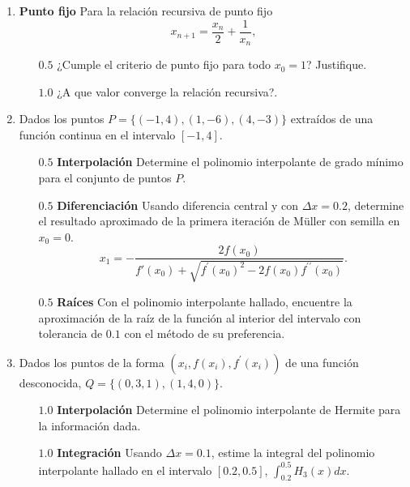 \documentclass[12pt]{article}
\begin{document}
  \begin{enumerate}[leftmargin=*,widest=9]
    \item \textbf{Punto fijo} Para la relación recursiva de punto fijo \[x_{n+1} = \frac{x_n}{2} + \frac{1}{x_n},\]
    \begin{itemize}
    \item[$0.5$] ¿Cumple el criterio de punto fijo para todo $x_0 = 1$? Justifique.
    \vspace{3.5cm}
    \item[$1.0$] ¿A que valor converge la relación recursiva?.
    \vspace{2cm}
    \end{itemize}
 \item Dados los puntos $P=\lbrace (-1, 4), (1, -6), (4, -3) \rbrace$ extraídos de una función continua en el intervalo $\left[-1, 4\right]$.
    \begin{itemize}
    \item[$0.5$] \textbf{Interpolación} Determine el polinomio interpolante de grado mínimo para el conjunto de puntos $P$.
    \vspace{5cm}
    \item[$0.5$] \textbf{Diferenciación} Usando diferencia central y con $\Delta x = 0.2$, determine el resultado aproximado de la primera iteración de M\"uller con semilla en $x_0=0$.
    \[
    x_1 = -\frac{2f(x_0)}{f\prime(x_0)+\sqrt{f^\prime(x_0)^2 - 2f(x_0)f^{\prime\prime}(x_0)}}.
    \]
    \vspace{4cm}
    \item[$0.5$] \textbf{Raíces} Con el polinomio interpolante hallado, encuentre la aproximación de la raíz de la función al interior del intervalo con tolerancia de $0.1$ con el método de su preferencia.
    \vspace{5cm}
    \end{itemize}
    \item Dados los puntos de la forma $(x_i, f(x_i), f^\prime (x_i))$ de una función desconocida, $Q=\lbrace (0, 3, 1), (1, 4, 0) \rbrace$.
    \begin{itemize}
    \item[$1.0$] \textbf{Interpolación} Determine el polinomio interpolante de Hermite para la información dada.
    \vspace{5cm}
    \item[$1.0$] \textbf{Integración} Usando $\Delta x = 0.1$, estime la integral del polinomio interpolante hallado en el intervalo $\left[0.2, 0.5\right]$, $\int_{0.2}^{0.5} H_{3}(x)dx$.
    \end{itemize}
  \end{enumerate}
\end{document}
